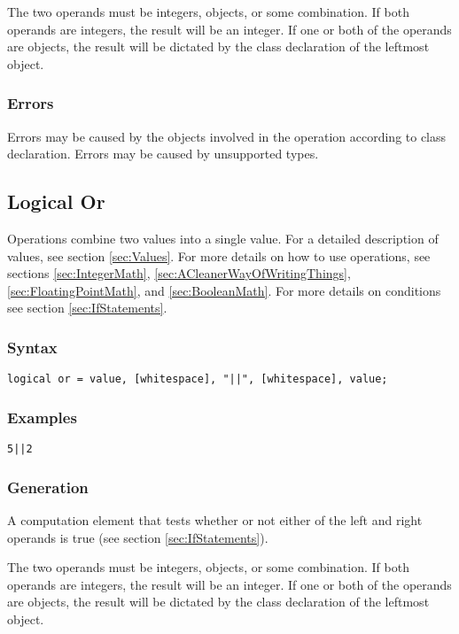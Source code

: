 \documentclass[10pt,a4paper]{article}
\begin{document}
The two operands must be integers, objects, or some combination. If both operands are integers, the result will be an integer. If one or both of the operands are objects, the result will be dictated by the class declaration of the leftmost object.

\subsubsection{Errors}
Errors may be caused by the objects involved in the operation according to class declaration. Errors may be caused by unsupported types.

\newpage




\subsection{Logical Or}
Operations combine two values into a single value. For a detailed description of values, see section \ref{sec:Values}. For more details on how to use operations, see sections \ref{sec:IntegerMath}, \ref{sec:ACleanerWayOfWritingThings}, \ref{sec:FloatingPointMath}, and \ref{sec:BooleanMath}. For more details on conditions see section \ref{sec:IfStatements}.

\subsubsection{Syntax}
\begin{verbatim}
logical or = value, [whitespace], "||", [whitespace], value;
\end{verbatim}

\subsubsection{Examples}
\begin{verbatim}
5||2
\end{verbatim}

\subsubsection{Generation}
A computation element that tests whether or not either of the left and right operands is true (see section \ref{sec:IfStatements}).

The two operands must be integers, objects, or some combination. If both operands are integers, the result will be an integer. If one or both of the operands are objects, the result will be dictated by the class declaration of the leftmost object.
\end{document}
